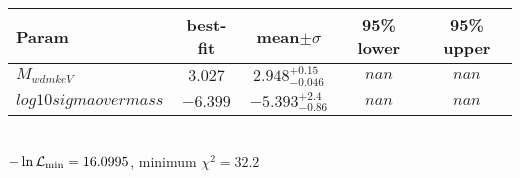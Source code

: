 \begin{tabular}{|l|c|c|c|c|} 
 \hline 
Param & best-fit & mean$\pm\sigma$ & 95\% lower & 95\% upper \\ \hline 
$M_{wdm keV }$ &$3.027$ & $2.948_{-0.046}^{+0.15}$ & $nan$ & $nan$ \\ 
$log10sigmaovermass$ &$-6.399$ & $-5.393_{-0.86}^{+2.4}$ & $nan$ & $nan$ \\ 
\hline 
 \end{tabular} \\ 
$-\ln{\cal L}_\mathrm{min} =16.0995$, minimum $\chi^2=32.2$ \\ 
